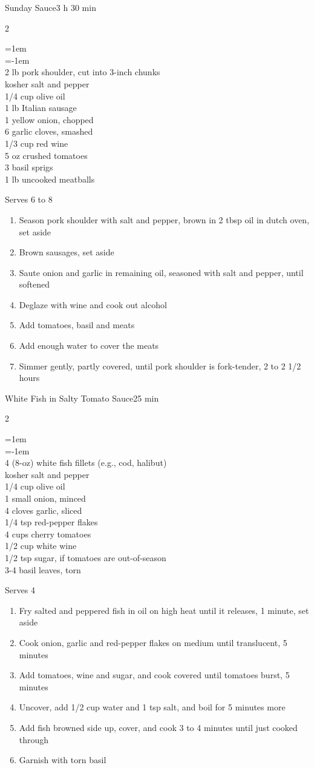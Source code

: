 \documentclass{article}
\newenvironment{recipe}[3][]
    {\begin{cardbase}[#1]{#2}{#3}
    \columnratio{0.333}
    \begin{paracol}{2}}
    {\end{paracol}\end{cardbase}}
\newenvironment{denserecipe}[3][]
    {\small
    \begin{recipe}[#1]{#2}{#3}}
    {\end{recipe}}
\newcommand{\nextcolumn}{\switchcolumn}
\newenvironment{ingredients}
    {
    \begin{obeylines}
    \vspace{\parskip}
    \setlength{\parskip}{0.25em}
    \vspace{-0.25em}
    \leftskip=1em
    \parindent=-1em}
    {\end{obeylines}}
\newenvironment{steps}
    {\begin{enumerate}[leftmargin=*,topsep=0pt]}
    {\end{enumerate}}
\newcommand{\tag}[1]{\hspace{1em}#1}
\newcommand{\symboltag}[2]{\tag{#1\hspace{0.4em}#2}}
\newcommand{\totaltime}[1]{\symboltag{\raisebox{-0.1em}{\small\StopWatchEnd}}{#1}}
\begin{document}
\begin{denserecipe}{Sunday Sauce}{\totaltime{3 h 30 min}}
\begin{ingredients}
2 lb pork shoulder, cut into 3-inch chunks
kosher salt and pepper
1/4 cup olive oil
1 lb Italian sausage
1 yellow onion, chopped
6 garlic cloves, smashed
1/3 cup red wine
5 oz crushed tomatoes
3 basil sprigs
1 lb uncooked meatballs
\end{ingredients}
\nextcolumn
Serves 6 to 8
\begin{steps}
\item Season pork shoulder with salt and pepper, brown in 2 tbsp oil in dutch oven, set aside
\item Brown sausages, set aside
\item Saute onion and garlic in remaining oil, seasoned with salt and pepper, until softened
\item Deglaze with wine and cook out alcohol
\item Add tomatoes, basil and meats
\item Add enough water to cover the meats
\item Simmer gently, partly covered, until pork shoulder is fork-tender, 2 to 2 1/2 hours
\end{steps}
\end{denserecipe}

\begin{denserecipe}{White Fish in Salty Tomato Sauce}{\totaltime{25 min}}
\begin{ingredients}
4 (8-oz) white fish fillets (e.g., cod, halibut)
kosher salt and pepper
1/4 cup olive oil
1 small onion, minced
4 cloves garlic, sliced
1/4 tsp red-pepper flakes
4 cups cherry tomatoes
1/2 cup white wine
1/2 tsp sugar, if tomatoes are out-of-season
3-4 basil leaves, torn
\end{ingredients}
\nextcolumn
Serves 4
\begin{steps}
\item Fry salted and peppered fish in oil on high heat until it releases, 1 minute, set aside
\item Cook onion, garlic and red-pepper flakes on medium until translucent, 5 minutes
\item Add tomatoes, wine and sugar, and cook covered until tomatoes burst, 5 minutes
\item Uncover, add 1/2 cup water and 1 tsp salt, and boil for 5 minutes more
\item Add fish browned side up, cover, and cook 3 to 4 minutes until just cooked through
\item Garnish with torn basil
\end{steps}
\end{denserecipe}
\end{document}
